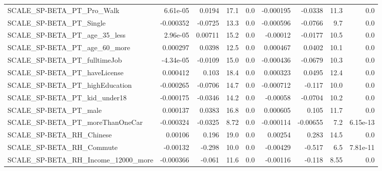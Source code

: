 \begin{tabular}{lrrrrrrrr}
SCALE\_SP-BETA\_PT\_Pro\_Walk                          &    6.61e-05 &       0.0194 &      17.1 &      0.0 &  -0.000195 &     -0.0338 &         11.3 &           0.0 \\
SCALE\_SP-BETA\_PT\_Single                            &   -0.000352 &      -0.0725 &      13.3 &      0.0 &  -0.000596 &     -0.0766 &          9.7 &           0.0 \\
SCALE\_SP-BETA\_PT\_age\_35\_less                       &    2.96e-05 &      0.00711 &      15.2 &      0.0 &   -0.00012 &     -0.0177 &         10.5 &           0.0 \\
SCALE\_SP-BETA\_PT\_age\_60\_more                       &    0.000297 &       0.0398 &      12.5 &      0.0 &   0.000467 &      0.0402 &         10.1 &           0.0 \\
SCALE\_SP-BETA\_PT\_fulltimeJob                       &   -4.34e-05 &      -0.0109 &      15.0 &      0.0 &  -0.000436 &     -0.0679 &         10.3 &           0.0 \\
SCALE\_SP-BETA\_PT\_haveLicense                       &    0.000412 &        0.103 &      18.4 &      0.0 &   0.000323 &      0.0495 &         12.4 &           0.0 \\
SCALE\_SP-BETA\_PT\_highEducation                     &   -0.000265 &      -0.0706 &      14.7 &      0.0 &  -0.000712 &      -0.117 &         10.0 &           0.0 \\
SCALE\_SP-BETA\_PT\_kid\_under18                       &   -0.000175 &      -0.0346 &      14.2 &      0.0 &   -0.00058 &     -0.0704 &         10.2 &           0.0 \\
SCALE\_SP-BETA\_PT\_male                              &    0.000137 &       0.0383 &      16.8 &      0.0 &   0.000605 &       0.105 &         11.7 &           0.0 \\
SCALE\_SP-BETA\_PT\_moreThanOneCar                    &   -0.000324 &      -0.0325 &      8.72 &      0.0 &  -0.000114 &    -0.00655 &          7.2 &      6.15e-13 \\
SCALE\_SP-BETA\_RH\_Chinese                           &     0.00106 &        0.196 &      19.0 &      0.0 &    0.00254 &       0.283 &         14.5 &           0.0 \\
SCALE\_SP-BETA\_RH\_Commute                           &    -0.00132 &       -0.298 &      10.0 &      0.0 &   -0.00429 &      -0.517 &          6.5 &      7.81e-11 \\
SCALE\_SP-BETA\_RH\_Income\_12000\_more                 &   -0.000366 &       -0.061 &      11.6 &      0.0 &   -0.00116 &      -0.118 &         8.55 &           0.0 \\

\end{tabular}
